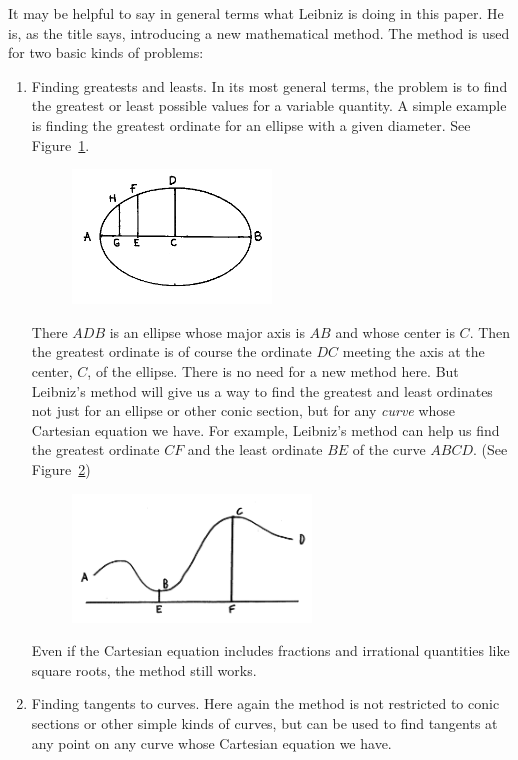 \documentclass[twoside,openright]{article}
\begin{document}
It may be helpful to say in general terms what Leibniz is doing in this paper.  He is, as the title says, introducing a new mathematical method.  The method is used for two basic kinds of problems: 
\begin{enumerate} 
\item Finding greatests and leasts.  In its most general terms, the problem is to find the greatest or least possible values for a variable quantity.  A simple example is finding the greatest ordinate for an ellipse with a given diameter.  See Figure~\ref{glord}.  
\begin{figure}[htp]
\begin{center}
\includegraphics[width=0.5\textwidth]{fig/Figure1}
\vspace{-20pt}
\caption{}
\label{glord}
\end{center}
\end{figure}


There $ADB$ is an ellipse whose major axis is $AB$ and whose center is $C$.  Then the greatest ordinate is of course the ordinate $DC$ meeting the axis at the center, $C$, of the ellipse.  There is no need for a new method here. But Leibniz's method will give us a way to find the greatest and least ordinates not just for an ellipse or other conic section, but for any {\em  curve} whose Cartesian equation we have.   For example,  Leibniz's method can help us find the greatest ordinate $CF$ and the least ordinate $BE$ of the curve $ABCD$. (See Figure~\ref{glord2})
\begin{figure}[htp]
\begin{center}
\includegraphics[width=0.6\textwidth]{fig/Figure1A}
\vspace{-20pt}
\caption{}
\label{glord2}
\end{center}
\end{figure}
 

Even if the Cartesian equation includes fractions and irrational quantities like square roots, the method still works.

\item Finding tangents to curves.  Here again the method is not restricted to conic sections or other simple kinds of curves, but can be used to find tangents at any point on any curve whose Cartesian equation we have.
\end{enumerate}
\end{document}
